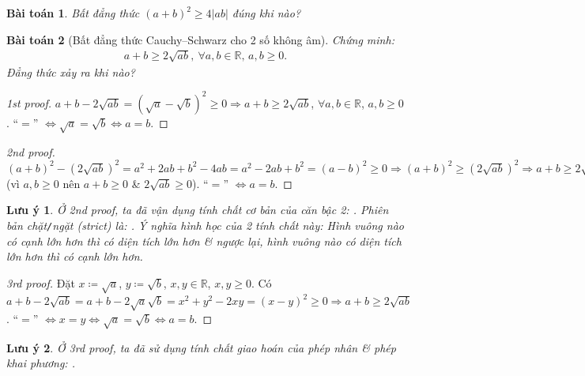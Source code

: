 \documentclass{article}
\newtheorem{baitoan}{Bài toán}
\newtheorem{luuy}{Lưu ý}
\begin{document}
\begin{baitoan}
	Bất đẳng thức $(a + b)^2\ge4|ab|$ đúng khi nào?
\end{baitoan}

\begin{baitoan}[Bất đẳng thức Cauchy--Schwarz cho 2 số không âm]
	Chứng minh:
	\begin{align*}
		\boxed{a + b\ge2\sqrt{ab},\ \forall a,b\in\mathbb{R},\,a,b\ge 0.}
	\end{align*}
	Đẳng thức xảy ra khi nào?
\end{baitoan}

\begin{proof}[1st proof]
	$a + b - 2\sqrt{ab} = (\sqrt{a} - \sqrt{b})^2\ge0\Rightarrow a + b\ge2\sqrt{ab}$, $\forall a,b\in\mathbb{R}$, $a,b\ge 0$. ``$=$'' $\Leftrightarrow\sqrt{a} = \sqrt{b}\Leftrightarrow a = b$.
\end{proof}

\begin{proof}[2nd proof]
	$(a + b)^2 - (2\sqrt{ab})^2 = a^2 + 2ab + b^2 - 4ab = a^2 - 2ab + b^2 = (a - b)^2\ge0\Rightarrow(a + b)^2\ge(2\sqrt{ab})^2\Rightarrow a + b\ge2\sqrt{ab}$ (vì $a,b\ge0$ nên $a + b\ge0$ \& $2\sqrt{ab}\ge0$). ``$=$'' $\Leftrightarrow a = b$.
\end{proof}

\begin{luuy}
	Ở 2nd proof, ta đã vận dụng tính chất cơ bản của căn bậc 2: . Phiên bản chặt\emph{\texttt{/}}ngặt (strict) là: . Ý nghĩa hình học của 2 tính chất này: Hình vuông nào có cạnh lớn hơn thì có diện tích lớn hơn \& ngược lại, hình vuông nào có diện tích lớn hơn thì có cạnh lớn hơn.
\end{luuy}

\begin{proof}[3rd proof]
	Đặt $x\coloneqq\sqrt{a}$, $y\coloneqq\sqrt{b}$, $x,y\in\mathbb{R}$, $x,y\ge0$. Có $a + b - 2\sqrt{ab} = a + b - 2\sqrt{a}\sqrt{b} = x^2 + y^2 - 2xy = (x - y)^2\ge0\Rightarrow a + b\ge2\sqrt{ab}$. ``$=$'' $\Leftrightarrow x = y\Leftrightarrow\sqrt{a} = \sqrt{b}\Leftrightarrow a = b$.
\end{proof}

\begin{luuy}
	Ở 3rd proof, ta đã sử dụng tính chất giao hoán của phép nhân \& phép khai phương: .
\end{luuy}
\end{document}
